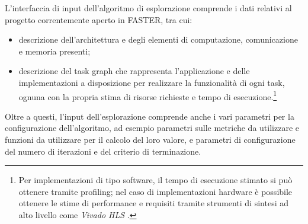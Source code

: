 L'interfaccia di input dell'algoritmo di esplorazione comprende i dati relativi al
progetto correntemente aperto in \ac{FASTER}, tra cui:
\begin{itemize}
  \item descrizione dell'architettura e degli elementi di computazione, comunicazione
    e memoria presenti;
  \item descrizione del task graph che rappresenta l'applicazione e delle implementazioni
    a disposizione per realizzare la funzionalit\`a di ogni task, ognuna con la propria stima
    di risorse richieste e tempo di esecuzione.\footnote{Per implementazioni di tipo software, il tempo di esecuzione
    stimato si pu\`o ottenere tramite profiling; nel caso di implementazioni hardware \`e possibile
    ottenere le stime di performance e requisiti tramite strumenti di sintesi ad alto
    livello come \emph{Vivado HLS} \cite{VivadoHLS}.}
\end{itemize}
Oltre a questi, l'input dell'esplorazione comprende anche i vari parametri per la configurazione
dell'algoritmo, ad esempio parametri sulle metriche da utilizzare e funzioni da utilizzare per il calcolo
del loro valore, e parametri di configurazione del numero di iterazioni e del criterio di terminazione.


